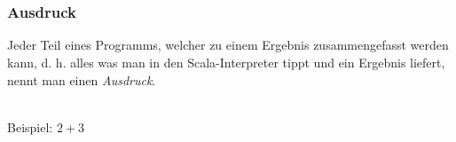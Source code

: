 	\section*{}
		\begin{frame}
			\frametitle{Ausdruck}
			\begin{definition}
				Jeder Teil eines Programms, welcher zu einem Ergebnis 								zusammengefasst werden kann, d. h. alles was man in den 
				Scala-Interpreter tippt und ein Ergebnis liefert,
				nennt man einen \emph{Ausdruck}.
		\end{definition} 
		\leavevmode \\
		Beispiel:  $2+3$	
		\end{frame}